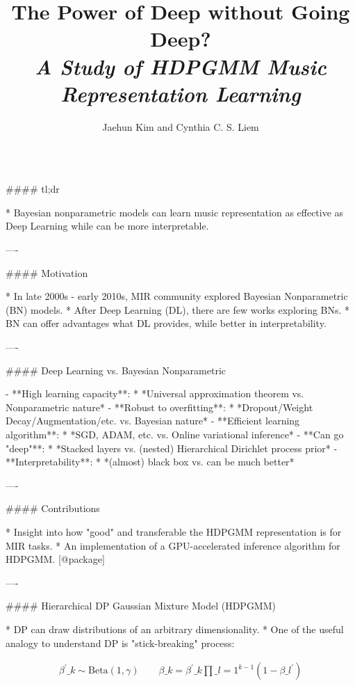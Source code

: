 \documentclass{beamer}
\author[j.h.kim@tudelft.nl]{Jaehun Kim and Cynthia C. S. Liem}
\title{\textbf{The Power of Deep without Going Deep?}\\ \textit{A Study of HDPGMM Music Representation Learning}}
\institute{Delft University of Technology}
\begin{document}
\begin{frame}[fragile]\centering



\begin{columns}[T]

\begin{column}{.46\textwidth}

\begin{markdown}

#### tl;dr

* Bayesian nonparametric models can learn music representation as effective as Deep Learning while can be more interpretable.

----


#### Motivation

* In late 2000s - early 2010s, MIR community explored Bayesian Nonparametric (BN) models.
* After Deep Learning (DL), there are few works exploring BNs.
* BN can offer advantages what DL provides, while better in interpretability.

----

#### Deep Learning vs. Bayesian Nonparametric

- **High learning capacity**:
    * *Universal approximation theorem vs. Nonparametric nature*
- **Robust to overfitting**:
    * *Dropout/Weight Decay/Augmentation/etc. vs. Bayesian nature*
- **Efficient learning algorithm**:
    * *SGD, ADAM, etc. vs. Online variational inference*
- **Can go "deep"**:
    * *Stacked layers vs. (nested) Hierarchical Dirichlet process prior*
- **Interpretability**:
    * *(almost) black box vs. can be much better*

----

#### Contributions

* Insight into how "good" and transferable the HDPGMM representation is for MIR tasks.
* An implementation of a GPU-accelerated inference algorithm for HDPGMM. [@package]

----

\bigskip
{\hrulefill}
\bigskip

#### Hierarchical DP Gaussian Mixture Model (HDPGMM)

* DP can draw distributions of an arbitrary dimensionality.
* One of the useful analogy to understand DP is "stick-breaking" process:

\begin{align}
    \beta^{\prime}\_{k} \sim \text{Beta}(1, \gamma) \qquad
    \beta\_{k} = \beta^{\prime}\_{k} \prod\_{l=1}^{k-1} (1 - \beta\_{l}^{\prime})
\end{align}



\end{markdown}
\end{column}
\end{columns}
\end{frame}
\end{document}
